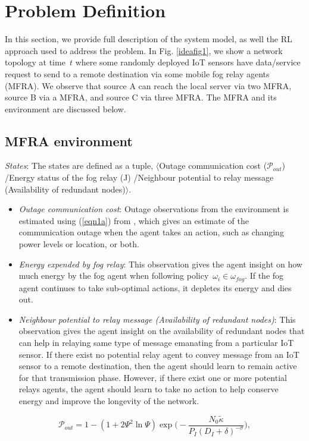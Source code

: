\documentclass[journal]{IEEEtran}
\begin{document}
\section{Problem Definition}
In this section, we provide full description of the system model, as well the RL approach used to address the problem. In Fig. \ref{ideafig1}, we show a network topology at time~$t$ where some randomly deployed IoT sensors have data/service request to send to a remote destination via some mobile fog relay agents (MFRA). We observe that source A can reach the local server via two MFRA, source B via a MFRA, and source C via three MFRA.
The MFRA and its environment are discussed below.

\subsection{MFRA environment}
\emph{States}: The states are defined as a tuple, $\langle$Outage communication cost ($\mathcal{P}_{out}$) /Energy status of the fog relay (J) /Neighbour potential to relay message (Availability of redundant nodes)$\rangle$.

\begin{itemize}
  \item \emph{Outage communication cost}: Outage observations from the environment is estimated using (\ref{eqn1a}) from \cite{OmoniwaRelay2018}, which gives an estimate of the communication outage when the agent takes an action, such as changing power levels or location, or both.
  \item \emph{Energy expended by fog relay}: This observation gives the agent insight on how much energy by the fog agent when following policy~$\omega_i \in \omega_{fog}$. If the fog agent continues to take sub-optimal actions, it depletes its energy and dies out.
  \item \emph{Neighbour potential to relay message (Availability of redundant nodes)}: This observation gives the agent insight on the availability of redundant nodes that can help in relaying same type of message emanating from a particular IoT sensor. If there exist no potential relay agent to convey message from an IoT sensor to a remote destination, then the agent should learn to remain active for that transmission phase. However, if there exist one or more potential relays agents, the agent should learn to take no action to help conserve energy and improve the longevity of the network.
\end{itemize}


\begin{equation}\label{eqn1a}
  \mathcal{P}_{out} = 1 - (1 + 2\Psi^2 \ln \Psi) \exp\Big( -\frac{N_0 \tilde{\kappa}}{P_{I} (D_{I} + \delta)^{-\sigma}}\Big),
\end{equation}
\end{document}
